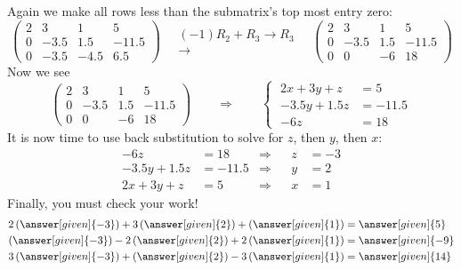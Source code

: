 \documentclass{ximera}
\begin{document}
\begin{example}
\begin{explanation}
\begin{center}
\end{center}
Again we make all rows less than the submatrix's top most entry zero:
\[
  \begin{pmatrix}
    2 & 3 & 1 & 5 \\
    0 & -3.5 & 1.5 &-11.5 \\
    0 & -3.5 & -4.5 & 6.5
  \end{pmatrix}
  \quad
  \begin{array}{c}
    \scriptstyle(-1) R_2+R_3\to R_3\\ \longrightarrow
  \end{array}
  \quad
  \begin{pmatrix}
    2 & 3 & 1 & 5 \\
    0 & -3.5 & 1.5 &-11.5 \\
    0 & 0    & -6 & 18
  \end{pmatrix}
\]
Now we see
\[
  \left(
    \begin{array}{ccc|c}
      2 & 3 & 1 & 5 \\
      0 & -3.5 & 1.5 &-11.5 \\
      0 & 0    & -6 & 18
    \end{array}
  \right)
  \qquad\Longrightarrow\qquad
  \left\{\;
    \begin{aligned}
      2x + 3y + z &= 5 \\
      -3.5y + 1.5z &= -11.5\\
      -6z &= 18
    \end{aligned}
  \right.
\]
It is now time to use back substitution to solve for $z$, then $y$, then $x$:
\begin{align*}
  -6z &= 18   &\Rightarrow & & z &= -3\\
  -3.5y+1.5z &=-11.5 &\Rightarrow & & y &= 2\\
  2x  +  3y + z &= 5 &\Rightarrow & & x &= 1
\end{align*}
Finally, you must check your work!
  \begin{align*}
    2\left(\answer[given]{-3}\right)+ 3\left(\answer[given]{2}\right) + \left(\answer[given]{1}\right)  &= \answer[given]{5} \\
    \left(\answer[given]{-3}\right) -2\left(\answer[given]{2}\right)+ 2\left(\answer[given]{1}\right) &=\answer[given]{-9}\\
    3\left(\answer[given]{-3}\right) +\left(\answer[given]{2}\right)- 3\left(\answer[given]{1}\right) &=\answer[given]{14}
  \end{align*}
\end{explanation}
\end{example}
\end{document}
